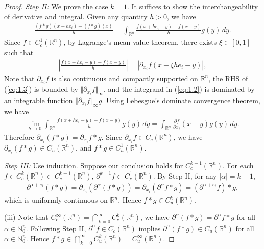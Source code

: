 \documentclass{article}
\numberwithin{equation}{section}
\newcommand{\bbR}{\mathbb{R}}
\theoremstyle{plain}
\theoremstyle{definition}
\begin{document}
\begin{proof}
	\textit{Step II:} We prove the case $k=1$. It suffices to show the interchangeability of derivative and integral. Given any quantity $h>0$, we have
	\begin{align}
		\frac{(f*g)(x+he_i) - (f*g)(x)}{h} = \int_{\bbR^n} \frac{f(x+he_i - y) - f(x-y)}{h}g(y)\,dy.\label{eq:1.2}
	\end{align}
	Since $f\in C^1_c(\mathbb{R}^n)$, by Lagrange's mean value theorem, there exists $\xi\in[0,1]$ such that
	\begin{align}
		\left\vert\frac{f(x+h e_i - y) - f(x-y)}{h}\right\vert = \left\vert \partial_{x_i}f(x+\xi h e_i - y)\right\vert,\label{eq:1.3}
	\end{align}
	Note that $\partial_{x_i}f$ is also continuous and compactly supported on $\mathbb{R}^n$, the RHS of (\ref{eq:1.3}) is bounded by $\Vert\partial_{x_i}f\Vert_\infty$, and the integrand in (\ref{eq:1.2}) is dominated by an integrable function $\Vert \partial_{x_i}f\Vert_\infty g$. Using Lebesgue's dominate convergence theorem, we have
	\begin{align*}
		\lim_{h\to 0}\int_{\bbR^n}\frac{f(x+h e_i - y) - f(x-y)}{h}g(y)\,dy = \int_{\bbR^n} \frac{\partial f}{\partial x_i}(x-y)g(y)\,dy.
	\end{align*}
	Therefore $\partial_{x_i}(f*g) = \partial_{x_i}f * g$. Since $\partial_{x_i}f\in C_c(\mathbb{R}^n)$, we have $\partial_{x_i}(f*g)\in C_u(\mathbb{R}^n)$, and $f*g\in C_u^1(\mathbb{R}^n)$.
	\vspace{0.1cm}
	
	\textit{Step III:} Use induction. Suppose our conclusion holds for $C_c^{k-1}(\mathbb{R}^n)$. For each $f\in C^k_c(\mathbb{R}^n)\subset C^{k-1}_c(\mathbb{R}^n)$, $\partial^{k-1} f\subset C^1_c(\mathbb{R}^n)$. By Step II, for any $\vert\alpha\vert=k-1$,
	\begin{align*}
		\partial^{\alpha+e_i}(f*g) = \partial_{x_i}(\partial^\alpha(f*g)) = \partial_{x_i}(\partial^\alpha f*g) = (\partial^{\alpha+e_i} f)* g,
	\end{align*} 
	which is uniformly continuous on $\mathbb{R}^n$. Hence $f*g\in C_u^k(\mathbb{R}^n)$.
	\vspace{0.1cm}
	
	(iii) Note that $C_c^\infty(\mathbb{R}^n) = \bigcap_{k=0}^\infty C_c^k(\mathbb{R}^n)$, we have $\partial^\alpha(f*g) = \partial^\alpha f * g$ for all $\alpha\in\mathbb{N}_0^n$. Following Step II, $\partial^\alpha f\in C_c(\mathbb{R}^n)$ implies $\partial^\alpha(f*g)\in C_u(\mathbb{R}^n)$ for all $\alpha\in\mathbb{N}_0^n$. Hence $f*g\in\bigcap_{k=0}^\infty C_u^k(\mathbb{R}^n) = C_u^\infty(\mathbb{R}^n)$.
\end{proof}
\end{document}
